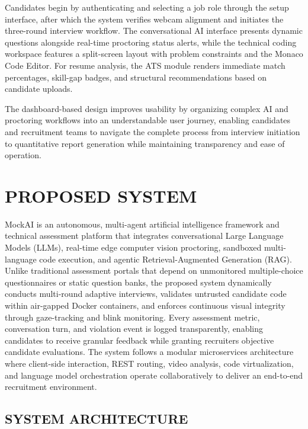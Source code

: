 \documentclass[12pt,a4paper]{report}
\begin{document}
Candidates begin by authenticating and selecting a job role through the setup interface,
after which the system verifies webcam alignment and initiates the three-round interview
workflow. The conversational AI interface presents dynamic questions alongside real-time
proctoring status alerts, while the technical coding workspace features a split-screen
layout with problem constraints and the Monaco Code Editor. For resume analysis, the ATS
module renders immediate match percentages, skill-gap badges, and structural
recommendations based on candidate uploads.

The dashboard-based design improves usability by organizing complex AI and proctoring
workflows into an understandable user journey, enabling candidates and recruitment teams
to navigate the complete process from interview initiation to quantitative report generation
while maintaining transparency and ease of operation.

\chapter{PROPOSED SYSTEM}

MockAI is an autonomous, multi-agent artificial intelligence framework and technical
assessment platform that integrates conversational Large Language Models (LLMs),
real-time edge computer vision proctoring, sandboxed multi-language code execution, and
agentic Retrieval-Augmented Generation (RAG). Unlike traditional assessment portals that
depend on unmonitored multiple-choice questionnaires or static question banks, the
proposed system dynamically conducts multi-round adaptive interviews, validates untrusted
candidate code within air-gapped Docker containers, and enforces continuous visual
integrity through gaze-tracking and blink monitoring. Every assessment metric, conversation
turn, and violation event is logged transparently, enabling candidates to receive granular
feedback while granting recruiters objective candidate evaluations. The system follows a
modular microservices architecture where client-side interaction, REST routing, video
analysis, code virtualization, and language model orchestration operate collaboratively to
deliver an end-to-end recruitment environment.

\section{SYSTEM ARCHITECTURE}
\end{document}
